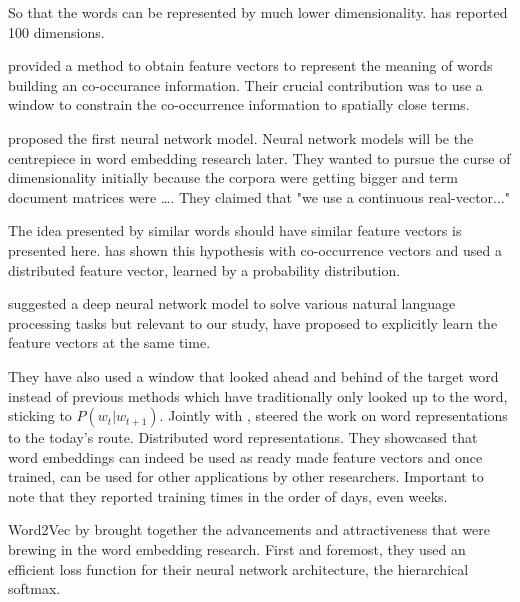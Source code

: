 So that the words can be represented by much lower dimensionality.
\citeauthor{deerwester_indexing_1990} has reported 100 dimensions.

\citeauthor{lund_producing_1996} provided a method to obtain feature vectors to represent the meaning of words building an co-occurance  information.
Their crucial contribution was to use a window to constrain the co-occurrence information to spatially close terms.

\textcite{bengio_neural_2000} proposed the first neural network model.
Neural network models will be the centrepiece in word embedding research later.
They wanted to pursue the curse of dimensionality initially because the corpora were getting bigger and term document matrices were \ldots.
They claimed that "we use a continuous real-vector..."

The idea presented by \citeauthor{lund_producing_1996} similar words should have similar feature vectors is presented here.
\citeauthor{lund_producing_1996} has shown this hypothesis with co-occurrence vectors and \citeauthor{bengio_neural_2000} used a distributed feature vector, learned by a probability distribution.

\citeauthor{collobert_unified_2008} suggested a deep neural network model to solve various natural language processing tasks but relevant to our study, have proposed to explicitly learn the feature vectors at the same time.

They have also used a window that looked ahead and behind of the target word instead of previous methods which have traditionally only looked up to the word, sticking to $P(w_t | w_{t+1})$.
Jointly with \citeauthor{collobert_unified_2008}, \citeauthor{p._turian_word_2010} steered the work on word representations to the today's route.
Distributed word representations.
They showcased that word embeddings can indeed be used as ready made feature vectors and once trained, can be used for other applications by other researchers.
Important to note that they reported training times in the order of days, even weeks.

Word2Vec by \textcite{mikolov_distributed_2013} brought together the advancements and attractiveness that were brewing in the word embedding research.
First and foremost, they used an efficient loss function for their neural network architecture, the hierarchical softmax. %

